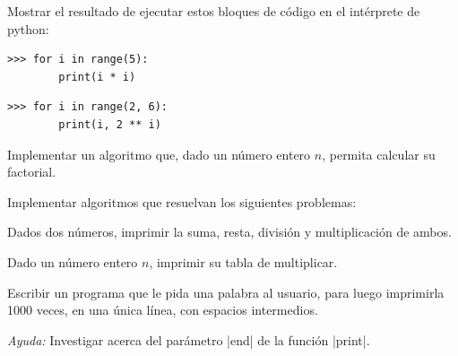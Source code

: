 \begin{ejercicio}
Mostrar el resultado de ejecutar estos bloques de código en el
intérprete de python:
\begin{partes}
\item \begin{verbatim}
>>> for i in range(5):
        print(i * i)
\end{verbatim}
\item \begin{verbatim}
>>> for i in range(2, 6):
        print(i, 2 ** i)
\end{verbatim}
\end{partes}
\end{ejercicio}

\begin{ejercicio} Implementar un algoritmo que, dado un número entero $n$,
    permita calcular su factorial.
\end{ejercicio}

\begin{ejercicio} Implementar algoritmos que resuelvan los siguientes
problemas:
\begin{partes}
  \item Dados dos números, imprimir la suma, resta, división y multiplicación
  de ambos.
  \item Dado un número entero $n$, imprimir su tabla de multiplicar.
\end{partes}
\end{ejercicio}

\begin{ejercicio}
Escribir un programa que le pida una palabra al usuario, para luego
imprimirla 1000 veces, en una única línea, con espacios intermedios.

{\it Ayuda:} Investigar acerca del parámetro |end| de la función |print|.
\end{ejercicio}
